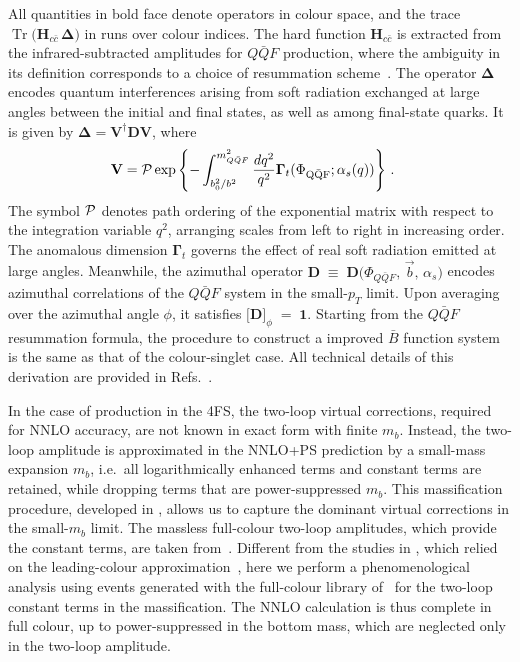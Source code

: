\documentclass[11pt,a4paper]{article}
\DeclareMathOperator{\Tr}{Tr}
\begin{document}
All quantities in bold face denote operators in colour space, and the trace $\Tr\bigl({\mathbf H}_{c\bar{c}}\,{\mathbf \Delta}\bigr)$
in  runs over colour indices.  The hard function \({\mathbf H}_{c\bar{c}}\) is extracted from the infrared-subtracted amplitudes for $Q\bar{Q}F$ production, 
where the ambiguity in its definition corresponds to a choice of resummation scheme~\cite{Bozzi:2005wk}.  The operator \({\mathbf \Delta}\) encodes quantum interferences arising from soft radiation exchanged at large angles between the initial and final states, as well as among final-state quarks. It is given by ${\mathbf \Delta}={\mathbf V}^\dagger{\mathbf D}{\mathbf V}$, where
\begin{align}
\label{eq:soft}
{\mathbf V} &= {\cal
  P}\exp\left\{-\int_{b_0^2/b^2}^{m_{Q\bar{Q}F}^2}\frac{dq^2}{q^2}{\mathbf
  \Gamma}_t(\Phi_{\rm Q\bar{Q}F};\alpha_s(q))\right\}\,.%
\end{align}
The symbol \({\cal P}\) denotes path ordering of the exponential matrix with respect to the integration variable \(q^{2}\), arranging scales from left to right in increasing order.  The anomalous dimension \(\mathbf{\Gamma}_{t}\) governs the effect of real soft radiation emitted at large angles.  Meanwhile, the azimuthal operator $\mathbf{D} \;\equiv\; \mathbf{D}\bigl(\Phi_{Q\bar{Q}F},\,\vec{b},\,\alpha_{s}\bigr)$
encodes azimuthal correlations of the \(Q\bar{Q}F\) system in the small-\(p_{T}\) limit.  Upon averaging over the azimuthal angle \(\phi\), it satisfies
$\bigl[\mathbf{D}\bigr]_{\phi} \;=\; \mathbf{1}$.
Starting from the $Q\bar Q F$ resummation formula, the procedure to construct a \minnlo{} improved $\bar{B}$ function system is the same as that of the colour-singlet case.
All technical details of this derivation are provided in Refs.~\cite{mazzitelli:2020jio,mazzitelli:2021mmm,mazzitelli:2024ura,Biello:2024pgo}.

In the case of \bbH{} production in the 4FS, the two-loop virtual corrections, required for NNLO accuracy,
are not known in exact form with finite $m_b$. Instead, the two-loop amplitude is approximated in the NNLO+PS
prediction by a small-mass expansion $m_b$, i.e.\ all logarithmically enhanced terms and constant terms are retained,
while dropping terms that are power-suppressed $m_b$. 
This massification procedure, developed in , allows us to capture the dominant 
virtual corrections in the small-$m_b$ limit. The massless full-colour two-loop amplitudes, which provide the constant
terms, are taken from~. Different from the studies in , which relied on 
the leading-colour approximation~\cite{badger:2021ega}, here we perform a phenomenological analysis using events 
generated with the full-colour library of~ for the two-loop constant terms in the massification. 
The NNLO calculation is thus complete in full colour, up to power-suppressed in the bottom mass, which are neglected
only in the two-loop amplitude.
\end{document}
